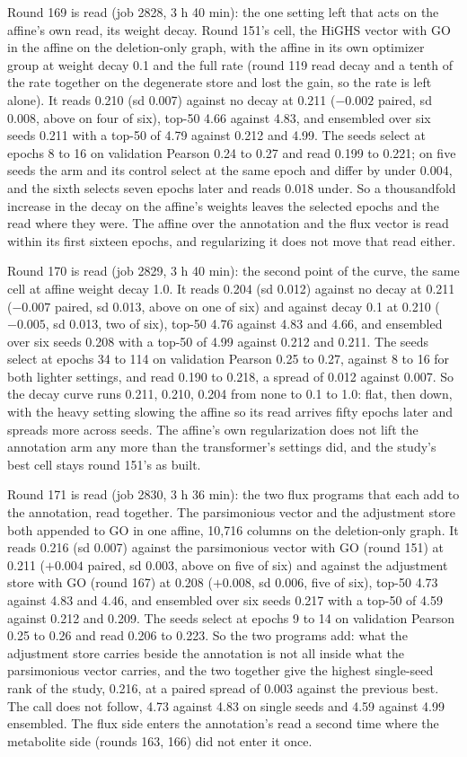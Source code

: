 Round 169 is read (job 2828, 3 h 40 min): the one setting left that acts on the
affine's own read, its weight decay. Round 151's cell, the HiGHS vector with GO in the
affine on the deletion-only graph, with the affine in its own optimizer group at weight
decay 0.1 and the full rate (round 119 read decay and a tenth of the rate together on
the degenerate store and lost the gain, so the rate is left alone). It reads 0.210
(sd 0.007) against no decay at 0.211 ($-0.002$ paired, sd 0.008, above on four of six),
top-50 4.66 against 4.83, and ensembled over six seeds 0.211 with a top-50 of 4.79
against 0.212 and 4.99. The seeds select at epochs 8 to 16 on validation Pearson 0.24 to
0.27 and read 0.199 to 0.221; on five seeds the arm and its control select at the same
epoch and differ by under 0.004, and the sixth selects seven epochs later and reads
0.018 under. So a thousandfold increase in the decay on the affine's weights leaves the
selected epochs and the read where they were. The affine over the annotation and the
flux vector is read within its first sixteen epochs, and regularizing it does not move
that read either.

Round 170 is read (job 2829, 3 h 40 min): the second point of the curve, the same cell
at affine weight decay 1.0. It reads 0.204 (sd 0.012) against no decay at 0.211
($-0.007$ paired, sd 0.013, above on one of six) and against decay 0.1 at 0.210
($-0.005$, sd 0.013, two of six), top-50 4.76 against 4.83 and 4.66, and ensembled over
six seeds 0.208 with a top-50 of 4.99 against 0.212 and 0.211. The seeds select at
epochs 34 to 114 on validation Pearson 0.25 to 0.27, against 8 to 16 for both lighter
settings, and read 0.190 to 0.218, a spread of 0.012 against 0.007. So the decay curve
runs 0.211, 0.210, 0.204 from none to 0.1 to 1.0: flat, then down, with the heavy
setting slowing the affine so its read arrives fifty epochs later and spreads more
across seeds. The affine's own regularization does not lift the annotation arm any more
than the transformer's settings did, and the study's best cell stays round 151's as
built.

Round 171 is read (job 2830, 3 h 36 min): the two flux programs that each add to the
annotation, read together. The parsimonious vector and the adjustment store both
appended to GO in one affine, 10,716 columns on the deletion-only graph. It reads 0.216
(sd 0.007) against the parsimonious vector with GO (round 151) at 0.211 ($+0.004$
paired, sd 0.003, above on five of six) and against the adjustment store with GO (round
167) at 0.208 ($+0.008$, sd 0.006, five of six), top-50 4.73 against 4.83 and 4.46, and
ensembled over six seeds 0.217 with a top-50 of 4.59 against 0.212 and 0.209. The seeds
select at epochs 9 to 14 on validation Pearson 0.25 to 0.26 and read 0.206 to 0.223. So
the two programs add: what the adjustment store carries beside the annotation is not
all inside what the parsimonious vector carries, and the two together give the highest
single-seed rank of the study, 0.216, at a paired spread of 0.003 against the previous
best. The call does not follow, 4.73 against 4.83 on single seeds and 4.59 against 4.99
ensembled. The flux side enters the annotation's read a second time where the
metabolite side (rounds 163, 166) did not enter it once.

